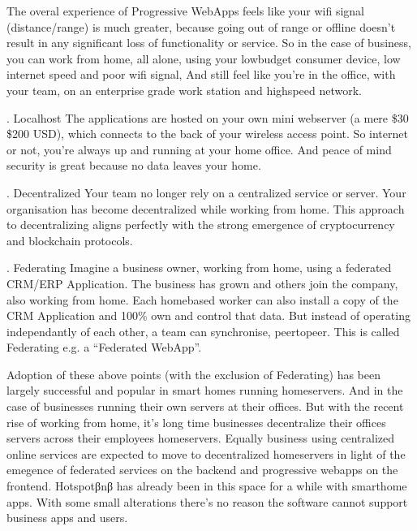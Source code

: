 \documentclass[letterpaper,10pt,openany,oneside,english]{sphinxmanual}
\begin{document}
\sphinxAtStartPar
The overal experience of Progressive WebApps feels like your wi\sphinxhyphen{}fi signal (distance/range) is much greater, because going out of range or offline doesn’t result in any significant loss of functionality or service.
So in the case of business, you can work from home, all alone, using your low\sphinxhyphen{}budget consumer device, low internet speed and poor wi\sphinxhyphen{}fi signal,
And still feel like you’re in the office, with your team, on an enterprise grade work station and high\sphinxhyphen{}speed network.

. Localhost
The applications are hosted on your own mini webserver (a mere \$30 \sphinxhyphen{} \$200 USD), which connects to the back of your wireless access point.
So internet or not, you’re always up and running at your home office. And peace of mind security is great because no data leaves your home.

. Decentralized
Your team no longer rely on a centralized service or server. Your organisation has become de\sphinxhyphen{}centralized while working from home.
This approach to decentralizing aligns perfectly with the strong emergence of cryptocurrency and blockchain protocols.

. Federating
Imagine a business owner, working from home, using a federated CRM/ERP Application.
The business has grown and others join the company, also working from home.
Each home\sphinxhyphen{}based worker can also install a copy of the CRM Application and 100\% own and control that data.
But instead of operating independantly of each other, a team can synchronise, peer\sphinxhyphen{}to\sphinxhyphen{}peer.
This is called Federating e.g. a “Federated WebApp”.

\sphinxAtStartPar
Adoption of these above points (with the exclusion of Federating) has been largely successful and popular in smart homes running homeservers.
And in the case of businesses running their own servers at their offices.
But with the recent rise of working from home, it’s long time businesses decentralize their offices servers across their employees homeservers.
Equally business using centralized online services are expected to move to decentralized homeservers in light of the emegence of federated services on the backend and progressive webapps on the front\sphinxhyphen{}end.
Hotspotβnβ has already been in this space for a while with smarthome apps. With some small alterations there’s no reason the software cannot support business apps and users.
\end{document}
